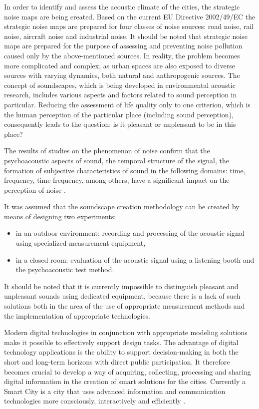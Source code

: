 \documentclass[a4paper,10pt]{article}
\begin{document}
\begin{multicols}{2}
In order to identify and assess the acoustic climate of the cities, the
strategic noise maps are being created. Based on the current EU Directive
2002/49/EC the strategic noise maps are prepared for four classes of noise
sources: road noise, rail noise, aircraft noise and industrial noise. It should
be noted that strategic noise maps are prepared for the purpose of assessing and
preventing noise pollution caused only by the above-mentioned sources. In
reality, the problem becomes more complicated and complex, as urban spaces are
also exposed to diverse sources with varying dynamics, both natural and
anthropogenic sources. The concept of soundscapes, which is being developed in
environmental acoustic research, includes various aspects and factors related to
sound perception in particular. Reducing the assessment of life quality only to
one criterion, which is the human perception of the particular place (including
sound perception), consequently leads to the question: is it pleasant or
unpleasant to be in this place?

The results of studies on the phenomenon of noise confirm that the
psychoacoustic aspects of sound, the temporal structure of the signal, the
formation of subjective characteristics of sound in the following domains: time,
frequency, time-frequency, among others, have a significant impact on the
perception of noise \cite{Gaja:2003, Neibo:2013, Nilsson:2007}.

It was assumed that the soundscape creation methodology can be created by means
of designing two experiments:
\begin{itemize}
    \item in an outdoor environment: recording and processing of the acoustic
    signal using specialized measurement equipment,

    \item in a closed room: evaluation of the acoustic signal using a listening
    booth and the psychoacoustic test method.
\end{itemize}

It should be noted that it is currently impossible to distinguish pleasant and
unpleasant sounds using dedicated equipment, because there is a lack of such
solutions both in the area of the use of appropriate measurement methods and the
implementation of appropriate technologies.

Modern digital technologies in conjunction with appropriate modeling solutions
make it possible to effectively support design tasks. The advantage of digital
technology applications is the ability to support decision-making in both the
short and long-term horizons with direct public participation. It therefore
becomes crucial to develop a way of acquiring, collecting, processing and
sharing digital information in the creation of smart solutions for the cities.
Currently a Smart City is a city that uses advanced information and
communication technologies more consciously, interactively and efficiently
\cite{Manville:2014}.


\end{multicols}
\end{document}
